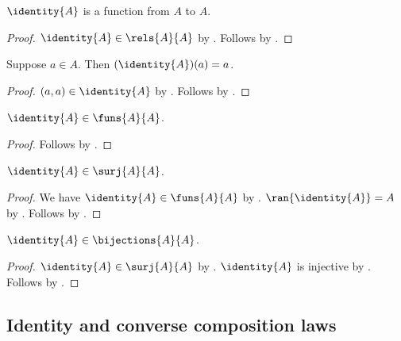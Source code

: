 \begin{proposition}\label{id_is_function_from_to}
    $\identity{A}$ is a function from $A$ to $A$.
\end{proposition}
\begin{proof}
    $\identity{A}\in\rels{A}{A}$ by .
    Follows by .
\end{proof}

\begin{proposition}\label{id_apply}
    Suppose $a\in A$.
    Then $(\identity{A})(a)=a$.
\end{proposition}
\begin{proof}
    $(a,a)\in\identity{A}$ by .
    Follows by .
\end{proof}

\begin{proposition}\label{id_elem_funs}
    $\identity{A}\in\funs{A}{A}$.
\end{proposition}
\begin{proof}
    Follows by .
\end{proof}


\begin{proposition}\label{id_elem_surjections}
    $\identity{A}\in\surj{A}{A}$.
\end{proposition}
\begin{proof}
    We have $\identity{A}\in\funs{A}{A}$ by .
    $\ran{\identity{A}}=A$ by .
    Follows by .
\end{proof}

\begin{proposition}\label{id_elem_bijections}
    $\identity{A}\in\bijections{A}{A}$.
\end{proposition}
\begin{proof}
    $\identity{A}\in\surj{A}{A}$ by .
    $\identity{A}$ is injective by .
    Follows by .
\end{proof}

\subsection{Identity and converse composition laws}

